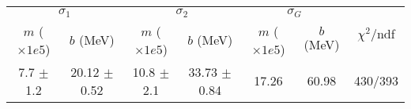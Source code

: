\begin{tabular}{cc|cc|cc||c}
\multicolumn{2}{c|}{$\sigma_1$} & \multicolumn{2}{|c}{$\sigma_2$} & \multicolumn{2}{|c}{$\sigma_G$}  & \multirow{2}{*}{$\chi^2/$ndf}\\
$m$ ($\times1e5$) & $b$ (MeV) & $m$ ($\times1e5$) & $b$ (MeV) & $m$ ($\times1e5$) & $b$ (MeV) & \\
\hline
7.7 $\pm$ 1.2 & 20.12 $\pm$ 0.52 & 10.8 $\pm$ 2.1 & 33.73 $\pm$ 0.84 & 17.26 & 60.98 & 430/393\\
\end{tabular}
